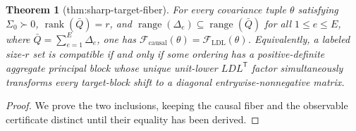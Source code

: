 \documentclass{article}
\newtheorem{theorem}{Theorem}
\begin{document}
\begin{theorem}[thm:sharp-target-fiber]\label{thm:sharp-target-fiber}
For every covariance tuple \(\theta\) satisfying \(\Sigma_0\succ0\), \(\operatorname{rank}(\bar Q)=r\), and \(\operatorname{range}(\Delta_e)\subseteq\operatorname{range}(\bar Q)\) for all \(1\le e\le E\), where \(\bar Q=\sum_{e=1}^E\Delta_e\), one has \(\mathcal F_{\mathrm{causal}}(\theta)=\mathcal F_{\mathrm{LDL}}(\theta)\).  Equivalently, a labeled size-\(r\) set is compatible if and only if some ordering has a positive-definite aggregate principal block whose unique unit-lower \(LDL^{\mathsf T}\) factor simultaneously transforms every target-block shift to a diagonal entrywise-nonnegative matrix.
\end{theorem}
\begin{proof}
We prove the two inclusions, keeping the causal fiber and the observable certificate distinct until their equality has been derived.


\end{proof}
\end{document}
